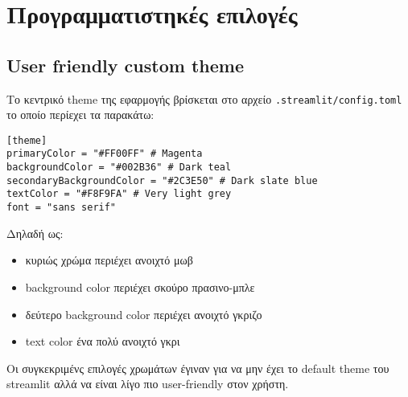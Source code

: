 \documentclass[a4paper,12pt]{article}
\begin{document}
\newpage



\section{Προγραμματιστηκές επιλογές}
\subsection{User friendly custom theme }
Το κεντρικό theme  της εφαρμογής βρίσκεται στο αρχείο \texttt{.streamlit/config.toml} το οποίο περίεχει τα παρακάτω:
\begin{lstlisting}
[theme]
primaryColor = "#FF00FF" # Magenta
backgroundColor = "#002B36" # Dark teal
secondaryBackgroundColor = "#2C3E50" # Dark slate blue
textColor = "#F8F9FA" # Very light grey
font = "sans serif"
\end{lstlisting}
Δηλαδή ως: 
\begin{itemize}
  \item κυριώς χρώμα περιέχει ανοιχτό μωβ
  \item {}background color περιέχει σκούρο πρασινο-μπλε
  \item δεύτερο background color περιέχει ανοιχτό γκριζο
  \item {}text color ένα πολύ ανοιχτό γκρι
\end{itemize}
Οι συγκεκριμένς επιλογές χρωμάτων έγιναν για να μην έχει το default theme του streamlit αλλά να είναι λίγο πιο user-friendly στον χρήστη.




\newpage
\end{document}
